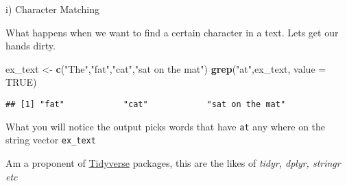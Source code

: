 \documentclass[ignorenonframetext,]{beamer}
\newenvironment{Shaded}{\begin{snugshade}}{\end{snugshade}}
\newcommand{\DataTypeTok}[1]{\textcolor[rgb]{0.13,0.29,0.53}{#1}}
\newcommand{\KeywordTok}[1]{\textcolor[rgb]{0.13,0.29,0.53}{\textbf{#1}}}
\newcommand{\NormalTok}[1]{#1}
\newcommand{\OtherTok}[1]{\textcolor[rgb]{0.56,0.35,0.01}{#1}}
\newcommand{\StringTok}[1]{\textcolor[rgb]{0.31,0.60,0.02}{#1}}
\begin{document}
\begin{frame}[fragile]

\begin{block}{i) Character Matching}

What happens when we want to find a certain character in a text. Lets
get our hands dirty.

\begin{Shaded}
\begin{Highlighting}[]
\NormalTok{ex_text <-}\StringTok{ }\KeywordTok{c}\NormalTok{(}\StringTok{"The"}\NormalTok{,}\StringTok{"fat"}\NormalTok{,}\StringTok{"cat"}\NormalTok{,}\StringTok{"sat on the mat"}\NormalTok{)}
\KeywordTok{grep}\NormalTok{(}\StringTok{"at"}\NormalTok{,ex_text, }\DataTypeTok{value =} \OtherTok{TRUE}\NormalTok{)}
\end{Highlighting}
\end{Shaded}

\begin{verbatim}
## [1] "fat"            "cat"            "sat on the mat"
\end{verbatim}

What you will notice the output picks words that have \texttt{at} any
where on the string vector \texttt{ex\_text}

Am a proponent of \href{http://https://www.tidyverse.org}{Tidyverse}
packages, this are the likes of \emph{tidyr, dplyr, stringr etc}

\end{block}

\end{frame}
\end{document}

